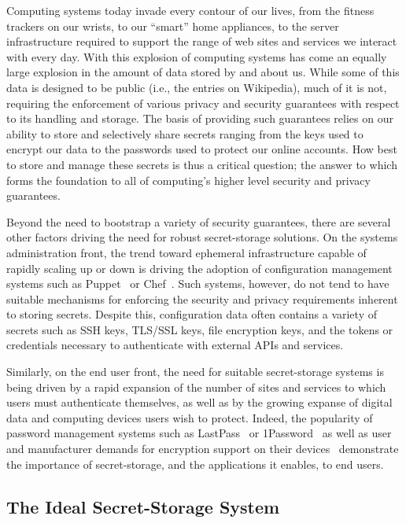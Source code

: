 Computing systems today invade every contour of our lives, from the
fitness trackers on our wrists, to our ``smart'' home appliances, to
the server infrastructure required to support the range of web sites
and services we interact with every day. With this explosion of
computing systems has come an equally large explosion in the amount of
data stored by and about us. While some of this data is designed to be
public (i.e., the entries on Wikipedia), much of it is not, requiring
the enforcement of various privacy and security guarantees with
respect to its handling and storage. The basis of providing such
guarantees relies on our ability to store and selectively share
secrets ranging from the keys used to encrypt our data to the
passwords used to protect our online accounts. How best to store and
manage these secrets is thus a critical question; the answer to which
forms the foundation to all of computing's higher level security and
privacy guarantees.

Beyond the need to bootstrap a variety of security guarantees, there
are several other factors driving the need for robust secret-storage
solutions. On the systems administration front, the trend toward
ephemeral infrastructure capable of rapidly scaling up or down is
driving the adoption of configuration management systems such as
Puppet~\cite{puppet} or Chef~\cite{chef}. Such systems, however, do
not tend to have suitable mechanisms for enforcing the security and
privacy requirements inherent to storing secrets. Despite this,
configuration data often contains a variety of secrets such as SSH
keys, TLS/SSL keys, file encryption keys, and the tokens or
credentials necessary to authenticate with external APIs and services.

Similarly, on the end user front, the need for suitable secret-storage
systems is being driven by a rapid expansion of the number of sites
and services to which users must authenticate themselves, as well as
by the growing expanse of digital data and computing devices users
wish to protect. Indeed, the popularity of password management systems
such as LastPass~\cite{lastpass} or 1Password~\cite{onepassword} as
well as user and manufacturer demands for encryption support on their
devices~\cite{apple-fbiletter} demonstrate the importance of
secret-storage, and the applications it enables, to end users.

\subsection{The Ideal Secret-Storage System}

